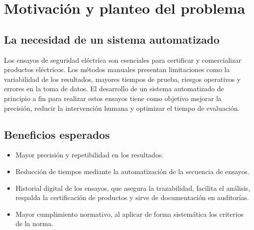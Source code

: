 \section{Motivación y planteo del problema}
\label{sec:motivacion}

\subsection{La necesidad de un sistema automatizado}

Los ensayos de seguridad eléctrica son esenciales para certificar y comercializar
productos eléctricos. Los métodos manuales presentan limitaciones como la
variabilidad de los resultados, mayores tiempos de prueba, riesgos operativos y
errores en la toma de datos. El desarrollo de un sistema automatizado de principio
a fin para realizar estos ensayos tiene como objetivo mejorar la precisión,
reducir la intervención humana y optimizar el tiempo de evaluación.

\subsection{Beneficios esperados}
\begin{itemize}
    \item Mayor precisión y repetibilidad en los resultados.
    \item Reducción de tiempos mediante la automatización de la secuencia de
          ensayos.
    \item Historial digital de los ensayos, que asegura la trazabilidad,
          facilita el análisis, respalda la certificación de productos y sirve de
          documentación en auditorías.
    \item Mayor cumplimiento normativo, al aplicar de forma sistemática los
          criterios de la norma.
\end{itemize}
